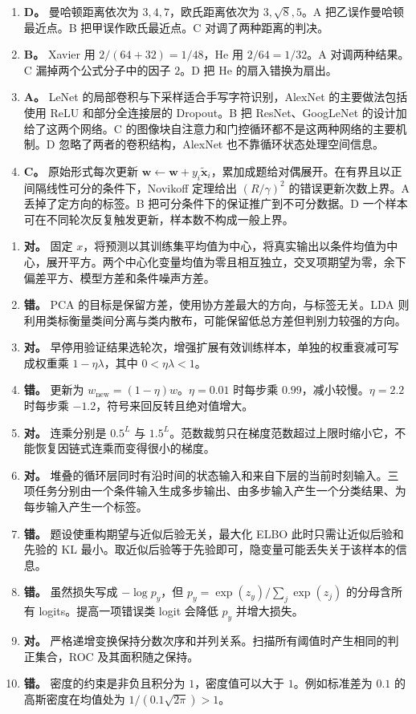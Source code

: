\begin{enumerate}[label=\arabic*.]
\item \textbf{D。} 曼哈顿距离依次为 $3,4,7$，欧氏距离依次为 $3,\sqrt8,5$。A 把乙误作曼哈顿最近点。B 把甲误作欧氏最近点。C 对调了两种距离的判决。
\item \textbf{B。} Xavier 用 $2/(64+32)=1/48$，He 用 $2/64=1/32$。A 对调两种结果。C 漏掉两个公式分子中的因子 $2$。D 把 He 的扇入错换为扇出。
\item \textbf{A。} LeNet 的局部卷积与下采样适合手写字符识别，AlexNet 的主要做法包括使用 ReLU 和部分全连接层的 Dropout。B 把 ResNet、GoogLeNet 的设计加给了这两个网络。C 的图像块自注意力和门控循环都不是这两种网络的主要机制。D 忽略了两者的卷积结构，AlexNet 也不靠循环状态处理空间信息。
\item \textbf{C。} 原始形式每次更新 $\bm w\gets\bm w+y_i\tilde{\bm x}_i$，累加成题给对偶展开。在有界且以正间隔线性可分的条件下，Novikoff 定理给出 $(R/\gamma)^2$ 的错误更新次数上界。A 丢掉了定方向的标签。B 把可分条件下的保证推广到不可分数据。D 一个样本可在不同轮次反复触发更新，样本数不构成一般上界。
\end{enumerate}

\begin{enumerate}[label=\arabic*.,start=11]
\item \textbf{对。} 固定 $x$，将预测以其训练集平均值为中心，将真实输出以条件均值为中心，展开平方。两个中心化变量均值为零且相互独立，交叉项期望为零，余下偏差平方、模型方差和条件噪声方差。
\item \textbf{错。} PCA 的目标是保留方差，使用协方差最大的方向，与标签无关。LDA 则利用类标衡量类间分离与类内散布，可能保留低总方差但判别力较强的方向。
\item \textbf{对。} 早停用验证结果选轮次，增强扩展有效训练样本，单独的权重衰减可写成权重乘 $1-\eta\lambda$，其中 $0<\eta\lambda<1$。
\item \textbf{错。} 更新为 $w_{\mathrm{new}}=(1-\eta)w$。$\eta=0.01$ 时每步乘 $0.99$，减小较慢。$\eta=2.2$ 时每步乘 $-1.2$，符号来回反转且绝对值增大。
\item \textbf{对。} 连乘分别是 $0.5^L$ 与 $1.5^L$。范数裁剪只在梯度范数超过上限时缩小它，不能恢复因链式连乘而变得很小的梯度。
\item \textbf{对。} 堆叠的循环层同时有沿时间的状态输入和来自下层的当前时刻输入。三项任务分别由一个条件输入生成多步输出、由多步输入产生一个分类结果、为每步输入产生一个标签。
\item \textbf{错。} 题设使重构期望与近似后验无关，最大化 ELBO 此时只需让近似后验和先验的 KL 最小。取近似后验等于先验即可，隐变量可能丢失关于该样本的信息。
\item \textbf{错。} 虽然损失写成 $-\log p_y$，但 $p_y=\exp(z_y)/\sum_j\exp(z_j)$ 的分母含所有 logits。提高一项错误类 logit 会降低 $p_y$ 并增大损失。
\item \textbf{对。} 严格递增变换保持分数次序和并列关系。扫描所有阈值时产生相同的判正集合，ROC 及其面积随之保持。
\item \textbf{错。} 密度的约束是非负且积分为 $1$，密度值可以大于 $1$。例如标准差为 $0.1$ 的高斯密度在均值处为 $1/(0.1\sqrt{2\pi})>1$。
\end{enumerate}

